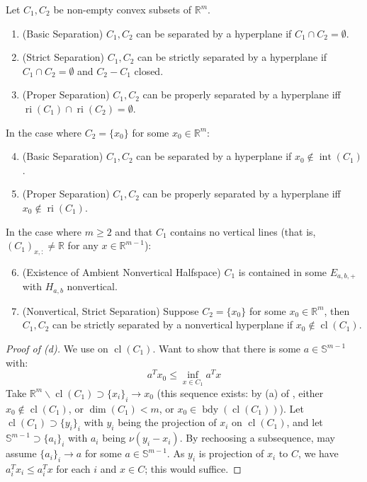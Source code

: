 \begin{prop}\label{prop:015-hyperplane-sep}
	Let $C_1,C_2$ be non-empty convex subsets of $\mathbb{R}^m$.
	\begin{enumerate}[label=(\alph*)]
		\item (Basic Separation) $C_1,C_2$ can be separated by a hyperplane if $C_1\cap C_2=\emptyset$.
		\item (Strict Separation) $C_1,C_2$ can be strictly separated by a hyperplane if $C_1\cap C_2=\emptyset$ and $C_2-C_1$ closed.
		\item (Proper Separation) $C_1,C_2$ can be properly separated by a hyperplane iff $\operatorname{ri}(C_1)\cap \operatorname{ri}(C_2)=\emptyset$.
	\end{enumerate}
	In the case where $C_2=\{x_0\}$ for some $x_0\in \mathbb{R}^m$:
	\begin{enumerate}[label=(\alph*)]
		\setcounter{enumi}{3}
		\item (Basic Separation) $C_1,C_2$ can be separated by a hyperplane if $x_0\notin \operatorname{int}(C_1)$.
		\item (Proper Separation) $C_1,C_2$ can be properly separated by a hyperplane iff $x_0\notin \operatorname{ri}(C_1)$.
	\end{enumerate}
	In the case where $m\geq 2$ and that $C_1$ contains no vertical lines (that is, $(C_{1})_{x,:}\neq \mathbb{R}$ for any $x\in \mathbb{R}^{m-1}$):
	\begin{enumerate}[label=(\alph*)]
		\setcounter{enumi}{5}
		\item (Existence of Ambient Nonvertical Halfspace) $C_1$ is contained in some $E_{a,b,+}$ with $H_{a,b}$ nonvertical.
		\item (Nonvertical, Strict Separation) Suppose $C_2=\{x_0\}$ for some $x_0\in \mathbb{R}^m$, then $C_1,C_2$ can be strictly separated by a nonvertical hyperplane if $x_0\notin \operatorname{cl}(C_1)$.
	\end{enumerate}
\end{prop}

\begin{proof}[Proof of (d)]
	We use  on $\operatorname{cl}(C_1)$. Want to show that there is some $a\in \mathbb{S}^{m-1}$ with:
	\[
		a^Tx_0\leq \underset{x\in C_1}{\operatorname{inf}}a^Tx
	\]
	Take $\mathbb{R}^m\smallsetminus \operatorname{cl}(C_1)\supset \{x_i\}_i\to x_0$ (this sequence exists: by (a) of , either $x_0\notin \operatorname{cl}(C_1)$, or $\operatorname{dim}(C_1)<m$, or $x_0\in\operatorname{bdy}(\operatorname{cl}(C_1))$). Let $\operatorname{cl}(C_1)\supset\{y_i\}_i$ with $y_i$ being the projection of $x_i$ on $\operatorname{cl}(C_1)$, and let $\mathbb{S}^{m-1}\supset \{a_i\}_i$ with $a_i$ being $\nu(y_i-x_i)$. By rechoosing a subsequence, may assume $\{a_i\}_i\to a$ for some $a\in \mathbb{S}^{m-1}$. As $y_i$ is projection of $x_i$ to $C$, we have $a_i^Tx_i\leq a_i^Tx$ for each $i$ and $x\in C$; this would suffice.
\end{proof}

